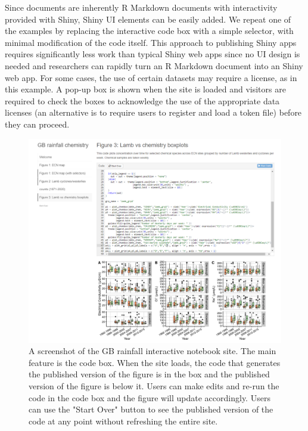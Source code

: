 Since  documents are inherently R Markdown documents
with interactivity provided with Shiny, Shiny UI elements can be easily
added. We repeat one of the examples by replacing the interactive code
box with a simple selector, with minimal modification of the code
itself. This approach to publishing Shiny apps requires significantly
less work than typical Shiny web apps since no UI design is needed and
researchers can rapidly turn an R Markdown document into an Shiny web
app. For some cases, the use of certain datasets may require a license,
as in this example. A pop-up box is shown when the site is loaded and
visitors are required to check the boxes to acknowledge the use of the
appropriate data licenses (an alternative is to require users to
register and load a token file) before they can proceed.

\begin{Schunk}
\begin{figure}
\includegraphics[width=\textwidth]{GB_notebook_screenshot} \caption[A screenshot of the GB rainfall interactive notebook site]{A screenshot of the GB rainfall interactive notebook site. The main feature is the code box. When the site loads, the code that generates the published version of the figure is in the box and the published version of the figure is below it. Users can make edits and re-run the code in the code box and the figure will update accordingly. Users can use the "Start Over" button to see the published version of the code at any point without refreshing the entire site.}\label{fig:fig2}
\end{figure}
\end{Schunk}

